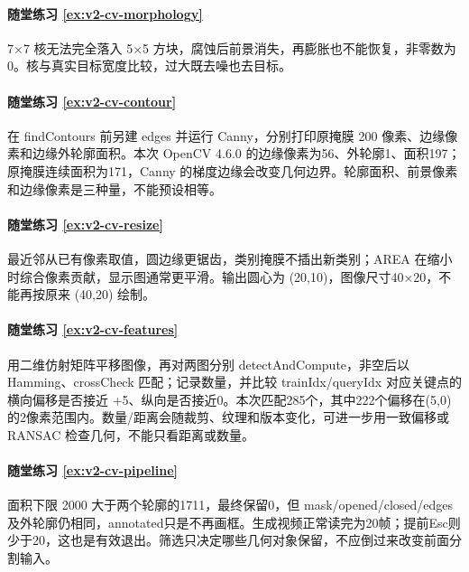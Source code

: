 \paragraph*{随堂练习 \ref{ex:v2-cv-morphology}}
\begin{solution}
7×7 核无法完全落入 5×5 方块，腐蚀后前景消失，再膨胀也不能恢复，非零数为 0。核与真实目标宽度比较，过大既去噪也去目标。
\end{solution}
\paragraph*{随堂练习 \ref{ex:v2-cv-contour}}
\begin{solution}
在 findContours 前另建 edges 并运行 Canny，分别打印原掩膜 200 像素、边缘像素和边缘外轮廓面积。本次 OpenCV 4.6.0 的边缘像素为56、外轮廓1、面积197；原掩膜连续面积为171，Canny 的梯度边缘会改变几何边界。轮廓面积、前景像素和边缘像素是三种量，不能预设相等。
\end{solution}
\paragraph*{随堂练习 \ref{ex:v2-cv-resize}}
\begin{solution}
最近邻从已有像素取值，圆边缘更锯齿，类别掩膜不插出新类别；AREA 在缩小时综合像素贡献，显示图通常更平滑。输出圆心为 (20,10)，图像尺寸40×20，不能再按原来 (40,20) 绘制。
\end{solution}
\paragraph*{随堂练习 \ref{ex:v2-cv-features}}
\begin{solution}
用二维仿射矩阵平移图像，再对两图分别 detectAndCompute，非空后以 Hamming、crossCheck 匹配；记录数量，并比较 trainIdx/queryIdx 对应关键点的横向偏移是否接近 +5、纵向是否接近0。本次匹配285个，其中222个偏移在(5,0)的2像素范围内。数量/距离会随裁剪、纹理和版本变化，可进一步用一致偏移或 RANSAC 检查几何，不能只看距离或数量。
\end{solution}
\paragraph*{随堂练习 \ref{ex:v2-cv-pipeline}}
\begin{solution}
面积下限 2000 大于两个轮廓的1711，最终保留0，但 mask/opened/closed/edges及外轮廓仍相同，annotated只是不再画框。生成视频正常读完为20帧；提前Esc则少于20，这也是有效退出。筛选只决定哪些几何对象保留，不应倒过来改变前面分割输入。
\end{solution}
